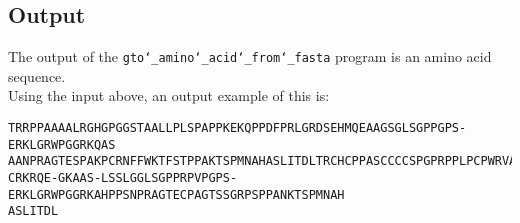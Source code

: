 \subsection*{Output}

The output of the \texttt{gto\char`_amino\char`_acid\char`_from\char`_fasta} program is an amino acid sequence.\\

Using the input above, an output example of this is:

\begin{lstlisting}
TRRPPAAAALRGHGPGGSTAALLPLSPAPPKEKQPPDFPRLGRDSEHMQEAAGSGLSGPPGPS-ERKLGRWPGGRKQAS
AANPRAGTESPAKPCRNFFWKTFSTPPAKTSPMNAHASLITDLTRCHCPPASCCCCSPGPRPPLPCPWRVAPPAETASI
CRKRQE-GKAAS-LSSLGGLSGPPRPVPGPS-ERKLGRWPGGRKAHPPSNPRAGTECPAGTSSGRPSPPANKTSPMNAH
ASLITDL
\end{lstlisting}
